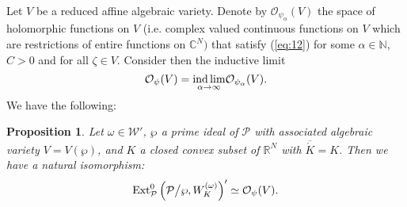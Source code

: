 \documentclass[twoside]{amsart}
\newtheorem{Prop}[Th]{Proposition}
\begin{document}
Let $V$ be a reduced affine algebraic variety. Denote by 
${\mathcal O}_{\psi_{\alpha}}(V)$
the space of holomorphic functions on $V$ (i.e. complex valued continuous
functions on $V$ which are restrictions of entire functions on $\mathbb{C}^{N})$
that satisfy (\ref{eq:12}) for some $\alpha\in{\mathbb N}$, $C>0$ and for
all $\zeta\in V$. Consider then the inductive limit 
\[
{\mathcal O}_{\psi}(V)=
\underset{\alpha\rightarrow\infty}{\mathop{\rm ind\,lim}}{\mathcal O}_{\psi_{\alpha}}(V).
\]
We have the following:

\begin{Prop}
\label{lem:LEMMA3}
Let $\omega\in{\mathcal{W}}'$, $\wp$ a prime ideal of ${\mathcal P}$ with
associated algebraic variety $V=V(\wp)$, and $K$ a closed convex
subset of ${\mathbb R}^N$ with $\overline{\mathring{K}}=K$. Then we have a
natural isomorphism:
\[
{\mathop{\rm Ext}\nolimits}_{{\mathcal P}}^{0}\left({\mathcal P}\bigl/\wp,W_{K}^{(\omega)}\right)'
\simeq{\mathcal O}_{\psi}(V).
\]
\end{Prop}
\end{document}
